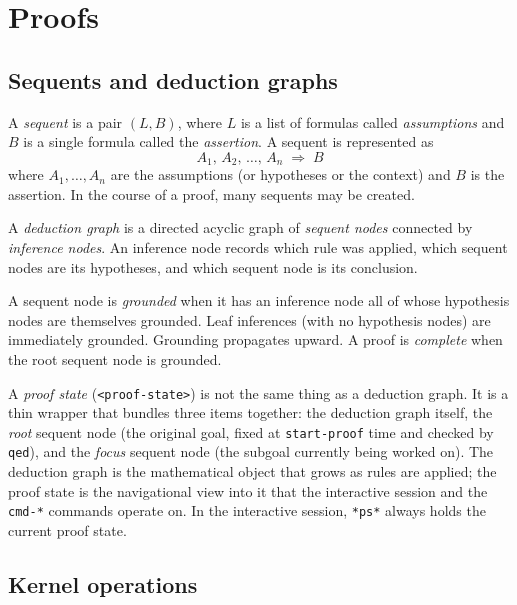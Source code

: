 \chapter{Proofs}
\label{ch:proofs}

\section{Sequents and deduction graphs}\label{section:sequents}

A \emph{sequent} is a pair $(L, B)$, where $L$ is a list of formulas
called \emph{assumptions} and $B$ is a single formula called the
\emph{assertion}.  A sequent is represented as
\[
  A_1,\, A_2,\, \ldots,\, A_n \;\Longrightarrow\; B
\]
where $A_1, \ldots, A_n$ are the assumptions (or hypotheses or the context) and $B$
is the assertion. In the course of a proof, many sequents may be created.

A \emph{deduction graph} is a directed acyclic graph of
\emph{sequent nodes} connected by \emph{inference nodes}.  An inference
node records which rule was applied, which sequent nodes are its
hypotheses, and which sequent node is its conclusion.

A sequent node is \emph{grounded} when it has an inference node all of
whose hypothesis nodes are themselves grounded.  Leaf inferences (with no
hypothesis nodes) are immediately grounded.  Grounding propagates upward.
A proof is \emph{complete} when the root sequent node is grounded.

\begin{remark}
A \emph{proof state} (\texttt{<proof-state>}) is not the same thing as a
deduction graph.  It is a thin wrapper that bundles three items together: the
deduction graph itself, the \emph{root} sequent node (the original goal,
fixed at \texttt{start-proof} time and checked by \texttt{qed}), and the
\emph{focus} sequent node (the subgoal currently being worked on).  The
deduction graph is the mathematical object that grows as rules are applied;
the proof state is the navigational view into it that the interactive session
and the \texttt{cmd-*} commands operate on.  In the interactive session,
\texttt{*ps*} always holds the current proof state.
\end{remark}

\section{Kernel operations}\label{sec:kernel-boundary}

